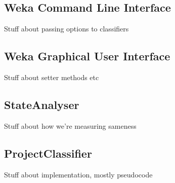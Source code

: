 \subsection{Weka Command Line Interface}
Stuff about passing options to classifiers
\subsection{Weka Graphical User Interface}
Stuff about setter methods etc
\subsection{StateAnalyser}
Stuff about how we're measuring sameness
\subsection{ProjectClassifier}
Stuff about implementation, mostly pseudocode
